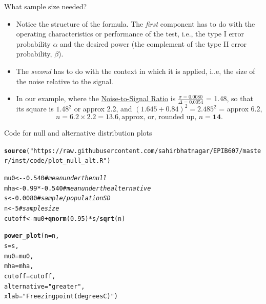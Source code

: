 \documentclass[10pt,handout]{beamer}\usepackage[]{graphicx}\usepackage[]{color}
\makeatletter
\newcommand{\hlnum}[1]{\textcolor[rgb]{0.686,0.059,0.569}{#1}}%
\newcommand{\hlstr}[1]{\textcolor[rgb]{0.192,0.494,0.8}{#1}}%
\newcommand{\hlcom}[1]{\textcolor[rgb]{0.678,0.584,0.686}{\textit{#1}}}%
\newcommand{\hlopt}[1]{\textcolor[rgb]{0,0,0}{#1}}%
\newcommand{\hlstd}[1]{\textcolor[rgb]{0.345,0.345,0.345}{#1}}%
\newcommand{\hlkwb}[1]{\textcolor[rgb]{0.69,0.353,0.396}{#1}}%
\newcommand{\hlkwc}[1]{\textcolor[rgb]{0.333,0.667,0.333}{#1}}%
\newcommand{\hlkwd}[1]{\textcolor[rgb]{0.737,0.353,0.396}{\textbf{#1}}}%
\newenvironment{kframe}{%
 \def\at@end@of@kframe{}%
 \ifinner\ifhmode%
  \def\at@end@of@kframe{\end{minipage}}%
  \begin{minipage}{\columnwidth}%
 \fi\fi%
 \def\FrameCommand##1{\hskip\@totalleftmargin \hskip-\fboxsep
 \colorbox{shadecolor}{##1}\hskip-\fboxsep
     \hskip-\linewidth \hskip-\@totalleftmargin \hskip\columnwidth}%
 \MakeFramed {\advance\hsize-\width
   \@totalleftmargin\z@ \linewidth\hsize
   \@setminipage}}%
 {\par\unskip\endMakeFramed%
 \at@end@of@kframe}
\newenvironment{knitrout}{}{} %
\makeatother
\begin{document}
\begin{frame}{What sample size needed?}
	\begin{itemize}
		\setlength\itemsep{1em}
		\item Notice the structure of the formula. The \textit{first} component has to do
		with the operating characteristics or performance of the test, i.e.,
		the type I error probability $\alpha$ and the desired power (the complement of the type II error probability, $\beta$).
		
		\pause 
		
		\item The \textit{second} has to do	with the context in which it is applied, i..e, the size of the noise relative to the  signal. \pause 
		
		\item In our example, where the \underline{Noise-to-Signal Ratio} is $\frac{\sigma = 0.0080}{\Delta = 0.0054}$ = 1.48, so that its square is $1.48^2$ or approx 2.2,	and $(1.645 + 0.84)^2 = 2.485^2$ = approx 6.2,	$$  n = 6.2  \times 2.2  =  13.6, \textrm{approx, or, rounded up,  } n = \textbf{14}. $$
	\end{itemize}
\end{frame}



\begin{frame}[fragile]{Code for null and alternative distribution plots}
\begin{knitrout}\tiny
{}\color{fgcolor}\begin{kframe}
\begin{alltt}
\hlkwd{source}\hlstd{(}\hlstr{"https://raw.githubusercontent.com/sahirbhatnagar/EPIB607/master/inst/code/plot_null_alt.R"}\hlstd{)}

\hlstd{mu0} \hlkwb{<-} \hlopt{-}\hlnum{0.540} \hlcom{# mean under the null}
\hlstd{mha} \hlkwb{<-} \hlnum{0.99}\hlopt{*-}\hlnum{0.540} \hlcom{# mean under the alternative}
\hlstd{s} \hlkwb{<-} \hlnum{0.0080} \hlcom{# sample/population SD}
\hlstd{n} \hlkwb{<-} \hlnum{5} \hlcom{# sample size}
\hlstd{cutoff} \hlkwb{<-} \hlstd{mu0} \hlopt{+} \hlkwd{qnorm}\hlstd{(}\hlnum{0.95}\hlstd{)} \hlopt{*} \hlstd{s} \hlopt{/} \hlkwd{sqrt}\hlstd{(n)}

\hlkwd{power_plot}\hlstd{(}\hlkwc{n} \hlstd{= n,}
\hlkwc{s} \hlstd{= s,}
\hlkwc{mu0} \hlstd{= mu0,}
\hlkwc{mha} \hlstd{= mha,}
\hlkwc{cutoff} \hlstd{= cutoff,}
\hlkwc{alternative} \hlstd{=} \hlstr{"greater"}\hlstd{,}
\hlkwc{xlab} \hlstd{=} \hlstr{"Freezing point (degrees C)"}\hlstd{)}
\end{alltt}
\end{kframe}
\end{knitrout}
\end{frame}
\end{document}
